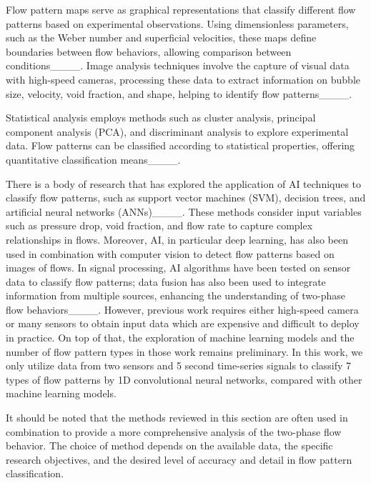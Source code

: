 Flow pattern maps serve as graphical representations that classify different flow patterns based on experimental observations. Using dimensionless parameters, such as the Weber number and superficial velocities, these maps define boundaries between flow behaviors, allowing comparison between conditions____. Image analysis techniques involve the capture of visual data with high-speed cameras, processing these data to extract information on bubble size, velocity, void fraction, and shape, helping to identify flow patterns____.

Statistical analysis employs methods such as cluster analysis, principal component analysis (PCA), and discriminant analysis to explore experimental data. Flow patterns can be classified according to statistical properties, offering quantitative classification means____. 

There is a body of research that has explored the application of AI techniques to classify flow patterns, such as support vector machines (SVM), decision trees, and artificial neural networks (ANNs)____. These methods consider input variables such as pressure drop, void fraction, and flow rate to capture complex relationships in flows. Moreover, AI, in particular deep learning, has also been used in combination with computer vision to detect flow patterns based on images of flows. In signal processing, AI algorithms have been tested on sensor data to classify flow patterns; data fusion has also been used to integrate information from multiple sources, enhancing the understanding of two-phase flow behaviors____. However, previous work requires either high-speed camera or many sensors to obtain input data which are expensive and difficult to deploy in practice. On top of that, the exploration of machine learning models and the number of flow pattern types in those work remains preliminary. In this work, we only utilize data from two sensors and 5 second time-series signals to classify 7 types of flow patterns by 1D convolutional neural networks, compared with other machine learning models.

It should be noted that the methods reviewed in this section are often used in combination to provide a more comprehensive analysis of the two-phase flow behavior. The choice of method depends on the available data, the specific research objectives, and the desired level of accuracy and detail in flow pattern classification.